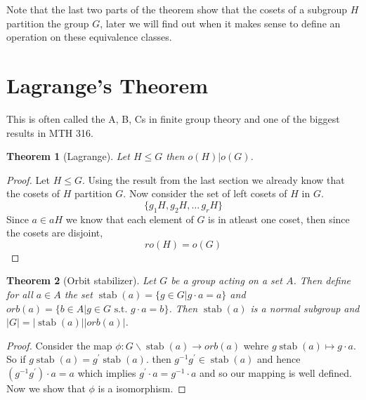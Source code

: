 \documentclass[11pt]{report}
\newcommand{\stab}{\operatorname{stab}}
\theoremstyle{break}
\newtheorem{thm}{Theorem}[section]
\begin{document}
Note that the last two parts of the theorem show that the cosets of a subgroup $H$ partition the group $G$, later we will find out 
when it makes sense to define an operation on these equivalence classes. 


\section{Lagrange's Theorem}
This is often called the A, B, Cs in finite group theory and one of the biggest results in MTH 316. 
\begin{thm}[Lagrange]
    Let $H \leq G$ then $o(H) | o(G)$. 
\end{thm}

\begin{proof}
    Let $H \leq G$. Using the result from the last section we already know that the cosets of $H$ partition $G$. Now consider 
    the set of left cosets of $H$ in $G$.
    \[\{g_1H, g_2H, \dots\, g_rH\} \]
    Since $a \in aH$ we know that each element of $G$ is in atleast one coset, then since the cosets are disjoint, 
     \[ro(H) = o(G)\]
    
\end{proof}


\begin{thm}[Orbit stabilizer]

    Let $G$ be a group acting on a set $A$. Then define for all $a \in A$ the set  $\stab(a) = \{g \in G| g \cdot a = a\}$
    and $orb(a) = \{b \in A| g \in G \text{ s.t. } g \cdot a = b\}$. Then $\stab(a)$ is a normal 
    subgroup and $|G| = |\stab(a)||orb(a)|$. 
\end{thm}


\begin{proof}
    Consider the map $\phi: G \backslash \stab(a) \to orb(a)$ wehre 
    $g \stab(a) \mapsto g \cdot a$. So if $g \stab(a) = g^\prime \stab(a)$. 
    then $g^{-1}g^\prime \in \stab(a)$ and hence $(g^{-1}g^\prime) \cdot a = a$
    which implies $g^\prime \cdot a = g^{-1} \cdot a$ and so our mapping is well defined. 
    Now we show that $\phi$ is a isomorphism. 

\end{proof}
\end{document}
